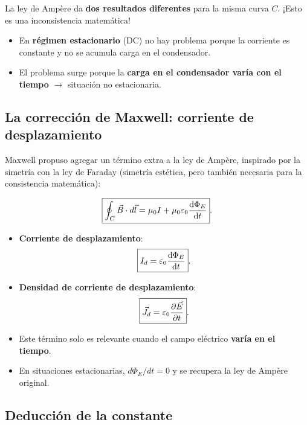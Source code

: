 \documentclass[12pt,a4paper]{article}
\begin{document}


\begin{warnbox}[Inconsistencia]
  La ley de Ampère da \textbf{dos resultados diferentes} para la
  misma curva \(C\). ¡Esto es una inconsistencia matemática!
\end{warnbox}

\begin{itemize}
  \item En \textbf{régimen estacionario} (DC) no hay problema porque
        la corriente es constante y no se acumula carga en el
        condensador.
  \item El problema surge porque la \textbf{carga en el condensador
        varía con el tiempo} \(\rightarrow\) situación no
        estacionaria.
\end{itemize}

\subsection{La corrección de Maxwell: corriente de desplazamiento}

Maxwell propuso agregar un término extra a la ley de Ampère,
inspirado por la simetría con la ley de Faraday (simetría estética,
pero también necesaria para la consistencia matemática):

\[
\boxed{\oint_C \vec B \cdot d\vec l
      = \mu_0 I + \mu_0 \varepsilon_0 \dv{\Phi_E}{t}}.
\]

\begin{itemize}
  \item \textbf{Corriente de desplazamiento}:
        \[
        \boxed{I_d = \varepsilon_0 \dv{\Phi_E}{t}}.
        \]
  \item \textbf{Densidad de corriente de desplazamiento}:
        \[
        \boxed{\vec J_d = \varepsilon_0 \pdv{\vec E}{t}}.
        \]
  \item Este término solo es relevante cuando el campo eléctrico
        \textbf{varía en el tiempo}.
  \item En situaciones estacionarias,
        \(d\Phi_E/dt = 0\) y se recupera la ley de Ampère original.
\end{itemize}

\subsection{Deducción de la constante}
\end{document}
